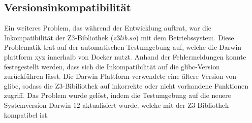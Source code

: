 \subsection{Versionsinkompatibilität}

Ein weiteres Problem, das während der Entwicklung auftrat, war die Inkompatibilität der Z3-Bibliothek ($z3lib.so$) mit dem Betriebssystem.
Diese Problematik trat auf der automatischen Testumgebung auf, welche die Darwin plattform xyz innerhalb von Docker nutzt.
Anhand der Fehlermeldungen konnte festegestellt werden, dass sich die Inkompatibilität auf die glibc-Version zurückführen lässt.
Die Darwin-Plattform verwendete eine ältere Version von glibc, sodass die Z3-Bibiliothek auf inkorrekte oder nicht vorhandene Funktionen zugriff.
Das Problem wurde gelöst, indem die Testumgebung auf die neuere Systemversion Darwin $12$ aktualisiert wurde, welche mit der Z3-Bibliothek kompatibel ist.
